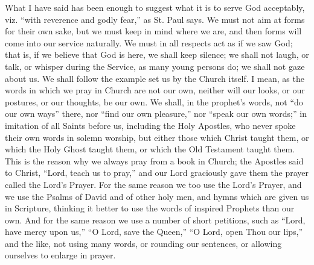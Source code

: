 What I have said has been enough to suggest what it is to serve God
acceptably, viz. ``with reverence and godly fear,'' as St.
Paul says. We must not aim at forms for their own sake, but we must
keep in mind where we are, and then forms will come into our service
naturally. We must in all respects act as if we saw God; that is, if
we believe that God is here, we shall keep silence; we shall not
laugh, or talk, or whisper during the Service, as many young persons
do; we shall not gaze about us. We shall follow the example set us by
the Church itself. I mean, as the words in which we pray in Church are
not our own, neither will our looks, or our postures, or our thoughts,
be our own. We shall, in the prophet's words, not ``do our own
ways'' there, nor ``find our own pleasure,'' nor
``speak our own words;'' in imitation of all Saints before us,
including the Holy Apostles, who never spoke their own words in solemn
worship, but either those which Christ taught them, or which the Holy
Ghost taught them, or which the Old Testament taught them. This is the
reason why we always pray from a book in Church; the Apostles said to
Christ, ``Lord, teach us to pray,'' and our Lord graciously
gave them the prayer called the Lord's Prayer. For the same reason we
too use the Lord's Prayer, and we use the Psalms of David and of other
holy men, and hymns which are given us in Scripture, thinking it
better to use the words of inspired Prophets than our own. And for the
same reason we use a number of short petitions, such as ``Lord,
have mercy upon us,'' ``O Lord, save the Queen,'' ``O
Lord, open Thou our lips,'' and the like, not using many words, or
rounding our sentences, or allowing ourselves to enlarge in prayer.

